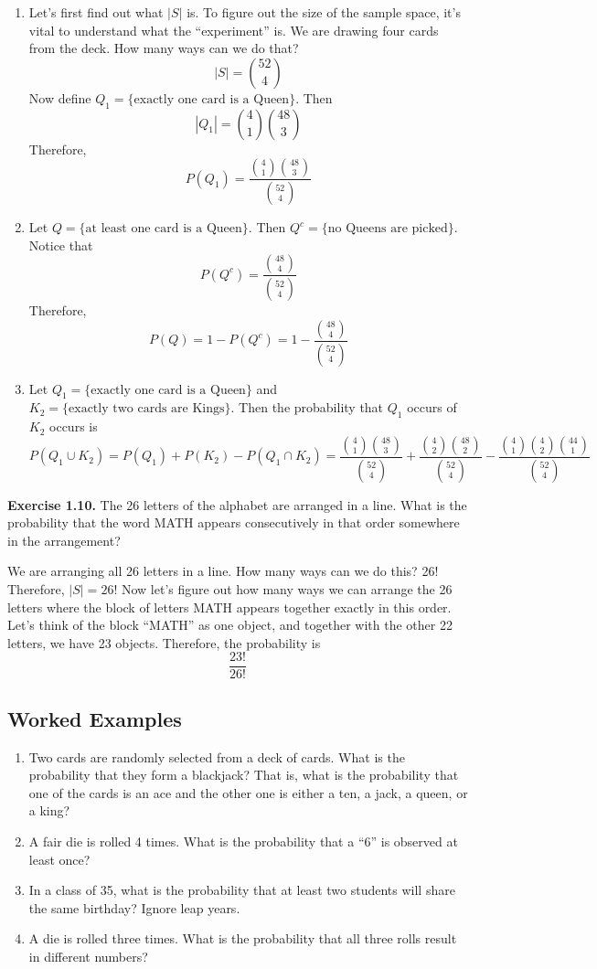 \documentclass[
  12pt,
]{krantzNoCorner}
\providecommand{\tightlist}{%
  \setlength{\itemsep}{0pt}\setlength{\parskip}{0pt}}
\begin{document}
\begin{enumerate}
\def\labelenumi{\arabic{enumi}.}
\tightlist
\item
  Let's first find out what \(|S|\) is. To figure out the size of the
  sample space, it's vital to understand what the ``experiment'' is. We
  are drawing four cards from the deck. How many ways can we do that?
  \[|S|=\binom{52}{4}\] Now define
  \(Q_1 = \{\text{exactly one card is a Queen}\}\). Then
  \[|Q_1|=\binom{4}{1}\binom{48}{3}\] Therefore,
  \[P(Q_1)=\frac{\binom{4}{1}\binom{48}{3}}{\binom{52}{4}}\]
\item
  Let \(Q=\{\text{at least one card is a Queen}\}.\) Then
  \(Q^c=\{\text{no Queens are picked}\}.\) Notice that
  \[P(Q^c)=\frac{\binom{48}{4}}{\binom{52}{4}}\]
  Therefore,\[P(Q)=1-P(Q^c)=1-\frac{\binom{48}{4}}{\binom{52}{4}}\]
\item
  Let \(Q_1 = \{\text{exactly one card is a Queen}\}\) and
  \(K_2 = \{\text{exactly two cards are Kings}\}.\) Then the probability
  that \(Q_1\) occurs of \(K_2\) occurs is
  \[P(Q_1\cup K_2)=P(Q_1)+P(K_2)-P(Q_1\cap K_2)=\frac{\binom{4}{1}\binom{48}{3}}{\binom{52}{4}}+\frac{\binom{4}{2}\binom{48}{2}}{\binom{52}{4}}-\frac{\binom{4}{1}\binom{4}{2}\binom{44}{1}}{\binom{52}{4}}\]
\end{enumerate}

\textbf{Exercise 1.10.} The 26 letters of the alphabet are arranged in a
line. What is the probability that the word MATH appears consecutively
in that order somewhere in the arrangement?

We are arranging all 26 letters in a line. How many ways can we do this?
26! Therefore, \(|S|=26!\) Now let's figure out how many ways we can
arrange the 26 letters where the block of letters MATH appears together
exactly in this order. Let's think of the block ``MATH'' as one object,
and together with the other 22 letters, we have 23 objects. Therefore,
the probability is \[\frac{23!}{26!}\]

\hypertarget{worked-examples-1}{%
\subsection{Worked Examples}\label{worked-examples-1}}

\begin{enumerate}
\def\labelenumi{\arabic{enumi}.}
\tightlist
\item
  Two cards are randomly selected from a deck of cards. What is the
  probability that they form a blackjack? That is, what is the
  probability that one of the cards is an ace and the other one is
  either a ten, a jack, a queen, or a king?
\item
  A fair die is rolled 4 times. What is the probability that a ``6'' is
  observed at least once?
\item
  In a class of 35, what is the probability that at least two students
  will share the same birthday? Ignore leap years.
\item
  A die is rolled three times. What is the probability that all three
  rolls result in different numbers?
\end{enumerate}
\end{document}
